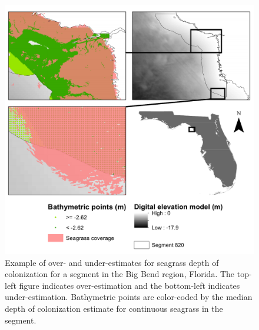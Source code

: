\documentclass[letterpaper,12pt]{article}\usepackage[]{graphicx}\usepackage[]{color}
\begin{document}
\begin{figure}
\includegraphics[width = \textwidth]{figs/wbid_doc2.pdf}
\caption{Example of over- and under-estimates for seagrass depth of colonization for a segment in the Big Bend region, Florida.  The top-left figure indicates over-estimation and the bottom-left indicates under-estimation.  Bathymetric points are color-coded by the median depth of colonization estimate for continuous seagrass in the segment.}
\label{fig:wbid_doc2}
\end{figure}
\end{document}

